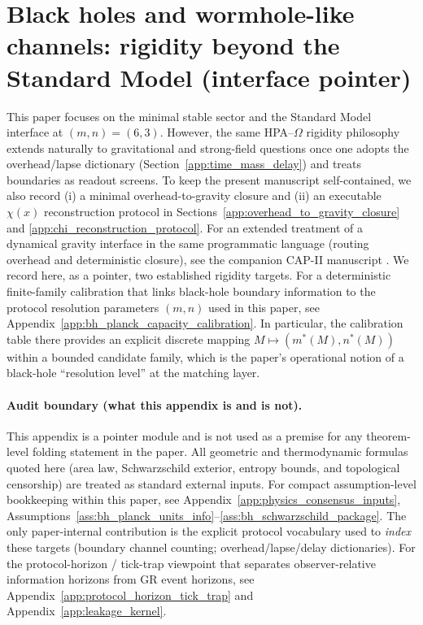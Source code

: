 \section[Black holes and wormhole-like channels]{Black holes and wormhole-like channels: rigidity beyond the Standard Model (interface pointer)}
\label{app:bh_wormholes_pointer}

This paper focuses on the minimal stable sector and the Standard Model interface at $(m,n)=(6,3)$.
However, the same HPA--$\Omega$ rigidity philosophy extends naturally to gravitational and strong-field questions once one adopts the overhead/lapse dictionary (Section~\ref{app:time_mass_delay}) and treats boundaries as readout screens.
To keep the present manuscript self-contained, we also record (i) a minimal overhead-to-gravity closure and (ii) an executable $\chi(x)$ reconstruction protocol in Sections~\ref{app:overhead_to_gravity_closure} and \ref{app:chi_reconstruction_protocol}.
For an extended treatment of a dynamical gravity interface in the same programmatic language (routing overhead and deterministic closure), see the companion CAP-II manuscript \cite{Ma2025CAPII}.
We record here, as a pointer, two established rigidity targets.
For a deterministic finite-family calibration that links black-hole boundary information to the protocol resolution parameters $(m,n)$ used in this paper, see Appendix~\ref{app:bh_planck_capacity_calibration}.
In particular, the calibration table there provides an explicit discrete mapping $M\mapsto(m^\ast(M),n^\ast(M))$ within a bounded candidate family, which is the paper's operational notion of a black-hole ``resolution level'' at the matching layer.

\paragraph{Audit boundary (what this appendix is and is not).}
\AuditTag This appendix is a pointer module and is not used as a premise for any theorem-level folding statement in the paper.
All geometric and thermodynamic formulas quoted here (area law, Schwarzschild exterior, entropy bounds, and topological censorship) are treated as standard external inputs.
For compact assumption-level bookkeeping within this paper, see Appendix~\ref{app:physics_consensus_inputs},
Assumptions~\ref{ass:bh_planck_units_info}--\ref{ass:bh_schwarzschild_package}.
The only paper-internal contribution is the explicit protocol vocabulary used to \emph{index} these targets (boundary channel counting; overhead/lapse/delay dictionaries).
\AuditTag For the protocol-horizon / tick-trap viewpoint that separates observer-relative information horizons from GR event horizons, see Appendix~\ref{app:protocol_horizon_tick_trap} and Appendix~\ref{app:leakage_kernel}.

